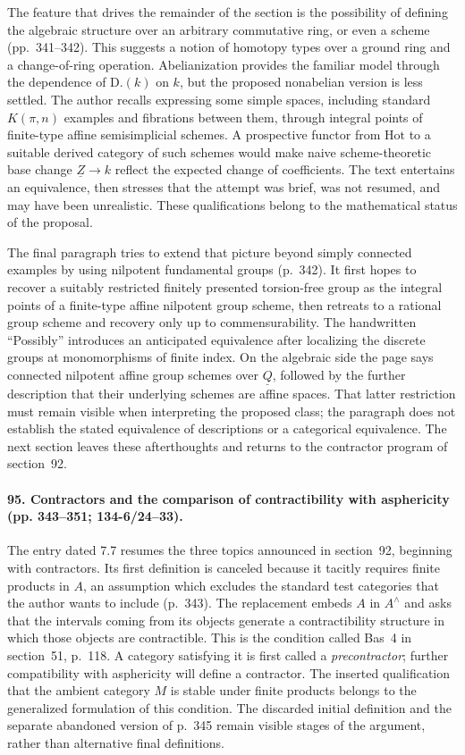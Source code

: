 The feature that drives the remainder of the section is the possibility of defining the algebraic structure over an arbitrary commutative ring, or even a scheme (pp.~341--342). This suggests a notion of homotopy types over a ground ring and a change-of-ring operation. Abelianization provides the familiar model through the dependence of $\mathrm{D.}(k)$ on $k$, but the proposed nonabelian version is less settled. The author recalls expressing some simple spaces, including standard $K(\pi,n)$ examples and fibrations between them, through integral points of finite-type affine semisimplicial schemes. A prospective functor from $\mathrm{Hot}$ to a suitable derived category of such schemes would make naive scheme-theoretic base change $\underline Z\to k$ reflect the expected change of coefficients. The text entertains an equivalence, then stresses that the attempt was brief, was not resumed, and may have been unrealistic. These qualifications belong to the mathematical status of the proposal.

The final paragraph tries to extend that picture beyond simply connected examples by using nilpotent fundamental groups (p.~342). It first hopes to recover a suitably restricted finitely presented torsion-free group as the integral points of a finite-type affine nilpotent group scheme, then retreats to a rational group scheme and recovery only up to commensurability. The handwritten ``Possibly'' introduces an anticipated equivalence after localizing the discrete groups at monomorphisms of finite index. On the algebraic side the page says connected nilpotent affine group schemes over $\underline Q$, followed by the further description that their underlying schemes are affine spaces. That latter restriction must remain visible when interpreting the proposed class; the paragraph does not establish the stated equivalence of descriptions or a categorical equivalence. The next section leaves these afterthoughts and returns to the contractor program of section~92.

\paragraph{95. Contractors and the comparison of contractibility with asphericity (pp. 343--351; 134-6/24--33).}
The entry dated 7.7 resumes the three topics announced in section~92, beginning with contractors. Its first definition is canceled because it tacitly requires finite products in $A$, an assumption which excludes the standard test categories that the author wants to include (p.~343). The replacement embeds $A$ in $A^{\wedge}$ and asks that the intervals coming from its objects generate a contractibility structure in which those objects are contractible. This is the condition called Bas~4 in section~51, p.~118. A category satisfying it is first called a \emph{precontractor}; further compatibility with asphericity will define a contractor. The inserted qualification that the ambient category $M$ is stable under finite products belongs to the generalized formulation of this condition. The discarded initial definition and the separate abandoned version of p.~345 remain visible stages of the argument, rather than alternative final definitions.

